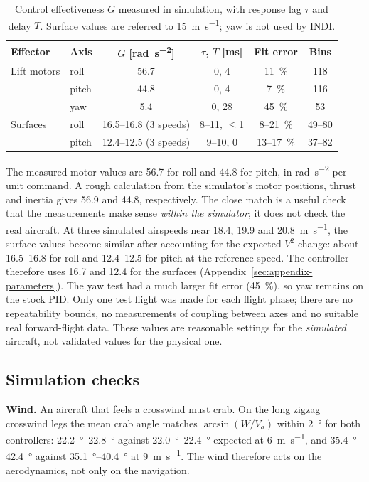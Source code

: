 \documentclass{article}
\begin{document}
\begin{table}[H]
\centering
\caption{Control effectiveness $G$ measured in simulation, with response lag $\tau$ and delay $T$. Surface values are referred to \SI{15}{\meter\per\second}; yaw is not used by INDI.}
\label{tab:identification}
\begin{tabular}{llcccc}
\hline
Effector & Axis & $G$ [\si{\radian\per\second\squared}] & $\tau$, $T$ [\si{\milli\second}] & Fit error & Bins \\
\hline
Lift motors & roll  & 56.7 & 0, 4 & \SI{11}{\percent} & 118 \\
\hline
            & pitch & 44.8 & 0, 4 & \SI{7}{\percent}  & 116 \\
\hline
            & yaw   & 5.4  & 0, 28 & \SI{45}{\percent} & 53 \\
\hline
Surfaces    & roll  & 16.5--16.8 (3 speeds) & 8--11, $\leq$1 & 8--\SI{21}{\percent} & 49--80 \\
\hline
            & pitch & 12.4--12.5 (3 speeds) & 9--10, 0 & 13--\SI{17}{\percent} & 37--82 \\
\hline
\end{tabular}
\end{table}

The measured motor values are 56.7 for roll and 44.8 for pitch, in \si{\radian\per\second\squared} per unit command. A rough calculation from the simulator's motor positions, thrust and inertia gives 56.9 and 44.8, respectively. The close match is a useful check that the measurements make sense \emph{within the simulator}; it does not check the real aircraft. At three simulated airspeeds near 18.4, 19.9 and \SI{20.8}{\meter\per\second}, the surface values become similar after accounting for the expected $V^2$ change: about 16.5--16.8 for roll and 12.4--12.5 for pitch at the reference speed. The controller therefore uses 16.7 and 12.4 for the surfaces (Appendix~\ref{sec:appendix-parameters}). The yaw test had a much larger fit error (\SI{45}{\percent}), so yaw remains on the stock PID. Only one test flight was made for each flight phase; there are no repeatability bounds, no measurements of coupling between axes and no suitable real forward-flight data. These values are reasonable settings for the \emph{simulated} aircraft, not validated values for the physical one.

\subsection{Simulation checks}
\label{sec:results-wind}
\textbf{Wind.} An aircraft that feels a crosswind must crab. On the long zigzag crosswind legs the mean crab angle matches $\arcsin(W/V_a)$ within \SI{2}{\degree} for both controllers: \SIrange{22.2}{22.8}{\degree} against \SIrange{22.0}{22.4}{\degree} expected at \SI{6}{\meter\per\second}, and \SIrange{35.4}{42.4}{\degree} against \SIrange{35.1}{40.4}{\degree} at \SI{9}{\meter\per\second}. The wind therefore acts on the aerodynamics, not only on the navigation.
\end{document}
